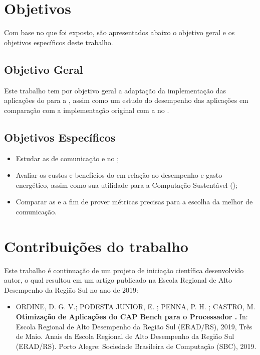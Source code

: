 \section{Objetivos}
\label{sec:objetivos}

Com base no que foi exposto, são apresentados abaixo o objetivo geral e os objetivos específicos deste trabalho.

\subsection{Objetivo Geral}
\label{sec:objetivogeral}

Este trabalho tem por objetivo geral a adaptação da implementação das aplicações do \capb para a \API \ASYNC, assim como um estudo do desempenho das aplicações em comparação com a implementação original com a \API \IPC no \mppa.

\subsection{Objetivos Específicos}
\label{sec:objetivosespecifico}

\begin{itemize}
\item Estudar as \APIs de comunicação \ASYNC e \IPC no \mppa;
\item Avaliar os custos e benefícios do \mppa em relação ao desempenho e gasto energético, assim como sua utilidade para a Computação Sustentável (\greencomputing);
\item Comparar as \APIs \ASYNC e \IPC a fim de prover métricas precisas para a escolha da melhor \API de comunicação.
\end{itemize}

\section{Contribuições do trabalho}

Este trabalho é continuação de um projeto de iniciação científica desenvolvido autor, o qual resultou em um artigo publicado na Escola Regional de Alto Desempenho da Região Sul no ano de 2019:

\begin{itemize}
  \item ORDINE, D. G. V.; PODESTA JUNIOR, E. ; PENNA, P. H. ; CASTRO, M. \textbf{Otimização de Aplicações do CAP Bench para o Processador \mppa.} In: Escola Regional de Alto Desempenho da Região Sul (ERAD/RS), 2019, Três de Maio. Anais da Escola Regional de Alto Desempenho da Região Sul (ERAD/RS). Porto Alegre: Sociedade Brasileira de Computação (SBC), 2019.
\end{itemize}

